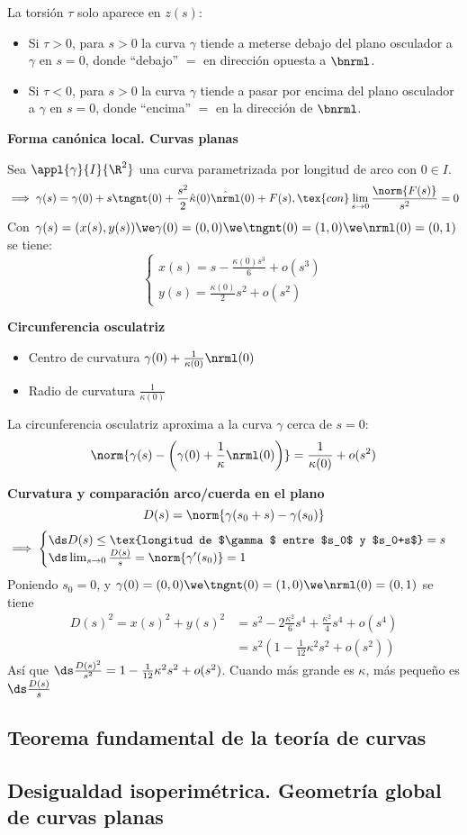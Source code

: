 La torsión $\tau$ solo aparece en $z(s)$:
\begin{itemize}
	\item Si $\tau > 0$, para $s>0$ la curva $\gamma$ tiende a meterse debajo del plano osculador a $\gamma$ en $s=0$, donde ``debajo'' $=$ en dirección opuesta a $\bnrml$.
	\item Si $\tau < 0$, para $s>0$ la curva $\gamma$ tiende a pasar por encima del plano osculador a $\gamma$ en $s=0$, donde ``encima'' $=$ en la dirección de $\bnrml$.
\end{itemize}

\textbf{Forma canónica local. Curvas planas}

Sea $\appl{\gamma}{I}{\R^2}$ una curva parametrizada por longitud de arco con $0\in I$.
\[\implies \gamma(s)=\gamma(0)+s\tngnt(0)+\frac{s^2}{2}\hat{\kappa}(0)\hat{\nrml}(0) + F(s), \tex{ con } \lim_{s\to 0}\frac{\norm{F(s)}}{s^2} = 0\]
Con $\gamma(s)=(x(s), y(s)) \we \gamma(0)=(0,0) \we \tngnt(0)=(1, 0) \we \nrml(0)=(0,1)$ se tiene:
\[\begin{cases}
		x(s)=s-\frac{\kappa(0)s^3}{6}+o(s^3) \\
		y(s)=\frac{\kappa(0)}{2}s^2 + o(s^2)
	\end{cases}\]

\textbf{Circunferencia osculatriz}

\begin{itemize}
	\item Centro de curvatura $\gamma(0) + \frac{1}{\kappa(0)}\nrml(0)$
	\item Radio de curvatura $\frac{1}{\kappa(0)}$
\end{itemize}
La circunferencia osculatriz aproxima a la curva $\gamma$ cerca de $s=0$:
\[\norm{\gamma(s)-\left(\gamma(0) + \frac{1}{\kappa}\nrml(0)\right)}=\frac{1}{\kappa(0)} + o(s^2)\]

\textbf{Curvatura y comparación arco/cuerda en el plano}
\[D(s)=\norm{\gamma(s_0+s) - \gamma(s_0)}\]
\[\implies \begin{cases}
		\ds D(s) \leq \tex{longitud de $\gamma$ entre $s_0$ y $s_0+s$} = s \\
		\ds \lim_{s\to 0} \frac{D(s)}{s} = \norm{\gamma'(s_0)} = 1
	\end{cases}\]
Poniendo $s_0=0$, y $\gamma(0)=(0,0) \we \tngnt(0)=(1, 0) \we \nrml(0)=(0, 1)$ se tiene
\[\begin{aligned} D(s)^2 = x(s)^2+y(s)^2 & = s^2-2\frac{\kappa^2}{6}s^4 + \frac{\kappa^2}{4}s^4 + o(s^4) \\
                                       & = s^2\left(1-\frac{1}{12}\kappa^2s^2+o(s^2)\right)\end{aligned}\]
Así que $\ds \frac{D(s)^2}{s^2} = 1-\frac{1}{12}\kappa^2s^2+o(s^2)$. Cuando más grande es $\kappa$, más pequeño es $\ds \frac{D(s)}{s}$

\subsection{Teorema fundamental de la teoría de curvas}

\subsection{Desigualdad isoperimétrica. Geometría global de curvas planas}
